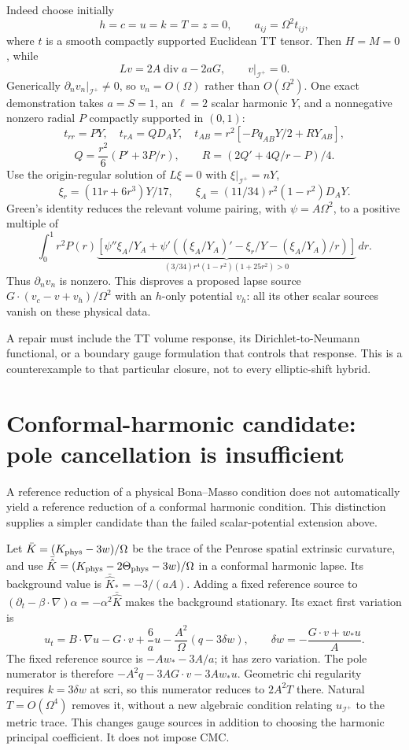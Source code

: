 \documentclass[11pt]{article}
\newcommand{\scri}{\mathscr I^+}
\begin{document}
Indeed choose initially
\[
h=c=u=k=T=z=0,\qquad a_{ij}=\Omega^2t_{ij},
\]
where $t$ is a smooth compactly supported Euclidean TT tensor.
Then $H=M=0$, while
\[
Lv=2A\operatorname{div}a-2aG,\qquad v|_{\scri}=0.
\]
Generically $\partial_nv_n|_{\scri}\ne0$, so $v_n=O(\Omega)$
rather than $O(\Omega^2)$. One exact demonstration takes $a=S=1$,
an $\ell=2$ scalar harmonic $Y$, and a nonnegative nonzero radial
$P$ compactly supported in $(0,1)$:
\[
t_{rr}=PY,\quad t_{rA}=QD_AY,\quad
t_{AB}=r^2[-Pq_{AB}Y/2+RY_{AB}],
\]
\[
Q=\frac{r^2}{6}(P'+3P/r),\qquad R=(2Q'+4Q/r-P)/4 .
\]
Use the origin-regular solution of $L\xi=0$ with $\xi|_{\scri}=nY$,
\[
\xi_r=(11r+6r^3)Y/17,\qquad
\xi_A=(11/34)r^2(1-r^2)D_AY .
\]
Green's identity reduces the relevant volume pairing, with
$\psi=A\Omega^2$, to a positive multiple of
\[
\int_0^1 r^2P(r)
\underbrace{[\psi''\xi_A/Y_A+
\psi'((\xi_A/Y_A)'-\xi_r/Y-(\xi_A/Y_A)/r)]}
_{(3/34)r^4(1-r^2)(1+25r^2)>0}\,dr .
\]
Thus $\partial_nv_n$ is nonzero. This disproves a proposed lapse
source $G\cdot(v_c-v+v_h)/\Omega^2$ with an $h$-only potential $v_h$:
all its other scalar sources vanish on these physical data.

A repair must include the TT volume response, its
Dirichlet-to-Neumann functional, or a boundary gauge formulation that
controls that response. This is a counterexample to that particular
closure, not to every elliptic-shift hybrid.

\section{Conformal-harmonic candidate: pole cancellation is insufficient}
A reference reduction of a physical Bona--Masso condition does not
automatically yield a reference reduction of a conformal harmonic
condition. This distinction supplies a simpler candidate than the
failed scalar-potential extension above.

Let $\bar K=(K_{\rm phys}-3w)/\Omega$ be the trace of the
Penrose spatial extrinsic curvature, and use
$\bar{\hat K}=(K_{\rm phys}-2\Theta_{\rm phys}-3w)/\Omega$
in a conformal harmonic lapse. Its background value is
$\bar{\hat K}_*=-3/(aA)$. Adding a fixed reference source to
$(\partial_t-\beta\cdot\nabla)\alpha=-\alpha^2\bar{\hat K}$
makes the background stationary. Its exact first variation is
\[
\boxed{
u_t=B\cdot\nabla u-G\cdot v+\frac6a u
-\frac{A^2}{\Omega}(q-3\delta w),\qquad
\delta w=-\frac{G\cdot v+w_*u}{A}.
}
\]
The fixed reference source is
$-Aw_*-3A/a$; it has zero variation.
The pole numerator is therefore
$-A^2q-3AG\cdot v-3Aw_*u$.
Geometric chi regularity requires $k=3\delta w$ at scri, so
this numerator reduces to $2A^2T$ there. Natural
$T=O(\Omega^4)$ removes it, without a new algebraic condition
relating $u_{\scri}$ to the metric trace.
This changes gauge sources in addition to choosing the harmonic
principal coefficient. It does not impose CMC.
\end{document}
